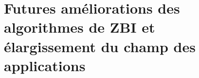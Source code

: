 \documentclass[\main/main.tex]{subfiles}
\begin{document}
\chapter{Futures améliorations des algorithmes de ZBI et élargissement du champ des applications}




\end{document}
